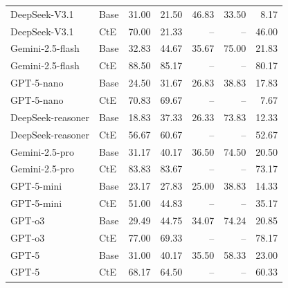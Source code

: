 \begin{table}[!t]
\begin{tabular}{llrrrrr}
\midrule
DeepSeek-V3.1 & Base & 31.00 & 21.50 & 46.83 & 33.50 & 8.17 \\
DeepSeek-V3.1 & CtE & 70.00 & 21.33 & -- & -- & 46.00 \\
\midrule
Gemini-2.5-flash & Base & 32.83 & 44.67 & 35.67 & 75.00 & 21.83 \\
Gemini-2.5-flash & CtE & 88.50 & 85.17 & -- & -- & 80.17 \\
\midrule
GPT-5-nano & Base & 24.50 & 31.67 & 26.83 & 38.83 & 17.83 \\
GPT-5-nano & CtE & 70.83 & 69.67 & -- & -- & 7.67 \\
\midrule
DeepSeek-reasoner & Base & 18.83 & 37.33 & 26.33 & 73.83 & 12.33 \\
DeepSeek-reasoner & CtE & 56.67 & 60.67 & -- & -- & 52.67 \\
\midrule
Gemini-2.5-pro & Base & 31.17 & 40.17 & 36.50 & 74.50 & 20.50 \\
Gemini-2.5-pro & CtE & 83.83 & 83.67 & -- & -- & 73.17 \\
\midrule
GPT-5-mini & Base & 23.17 & 27.83 & 25.00 & 38.83 & 14.33 \\
GPT-5-mini & CtE & 51.00 & 44.83 & -- & -- & 35.17 \\
\midrule
GPT-o3 & Base & 29.49 & 44.75 & 34.07 & 74.24 & 20.85 \\
GPT-o3 & CtE & 77.00 & 69.33 & -- & -- & 78.17 \\
\midrule
GPT-5 & Base & 31.00 & 40.17 & 35.50 & 58.33 & 23.00 \\
GPT-5 & CtE & 68.17 & 64.50 & -- & -- & 60.33 \\
\bottomrule
\end{tabular}
\label{tab:cRi_by_id_act}
\end{table}

